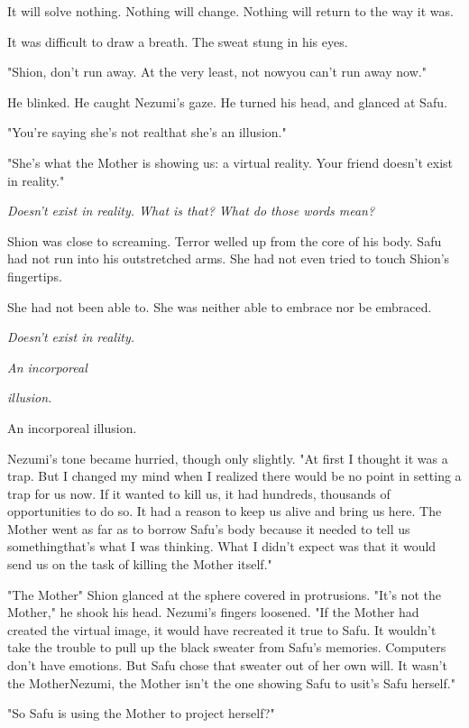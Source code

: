 It will solve nothing. Nothing will change. Nothing will return to the
way it was.

It was difficult to draw a breath. The sweat stung in his eyes.

"Shion, don't run away. At the very least, not now\el you can't run away
now."

He blinked. He caught Nezumi's gaze. He turned his head, and glanced at
Safu.

"\el You're saying she's not real\el that she's an illusion."

"She's what the Mother is showing us: a virtual reality. Your friend
doesn't exist in reality."

\emph{Doesn't exist in reality. What is that? What do those words mean?}

Shion was close to screaming. Terror welled up from the core of his
body. Safu had not run into his outstretched arms. She had not even
tried to touch Shion's fingertips.

She had not been able to. She was neither able to embrace nor be
embraced.

\emph{Doesn't exist in reality.}

\emph{An incorporeal}

\emph{\hspace{2.4cm}illusion.}

An incorporeal illusion.

Nezumi's tone became hurried, though only slightly. "At first I thought
it was a trap. But I changed my mind when I realized there would be no
point in setting a trap for us now. If it wanted to kill us, it had
hundreds, thousands of opportunities to do so. It had a reason to keep
us alive and bring us here. The Mother went as far as to borrow Safu's
body because it needed to tell us something\el that's what I was
thinking. What I didn't expect was that it would send us on the task of
killing the Mother itself."

"The Mother\el " Shion glanced at the sphere covered in protrusions.
"It's not the Mother," he shook his head. Nezumi's fingers loosened. "If
the Mother had created the virtual image, it would have recreated it
true to Safu. It wouldn't take the trouble to pull up the black sweater
from Safu's memories. Computers don't have emotions. But Safu chose that
sweater out of her own will. It wasn't the Mother\el Nezumi, the Mother
isn't the one showing Safu to us\el it's Safu herself."

"So Safu is using the Mother to project herself?"

